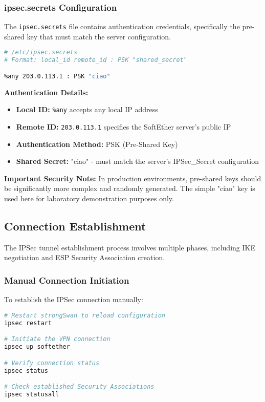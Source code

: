 \subsubsection{ipsec.secrets Configuration}

The \texttt{ipsec.secrets} file contains authentication credentials, specifically the pre-shared key that must match the server configuration.

\begin{lstlisting}[language=bash]
# /etc/ipsec.secrets
# Format: local_id remote_id : PSK "shared_secret"

%any 203.0.113.1 : PSK "ciao"
\end{lstlisting}

\textbf{Authentication Details:}

\begin{itemize}
    \item \textbf{Local ID:} \texttt{\%any} accepts any local IP address
    \item \textbf{Remote ID:} \texttt{203.0.113.1} specifies the SoftEther server's public IP
    \item \textbf{Authentication Method:} PSK (Pre-Shared Key)
    \item \textbf{Shared Secret:} "ciao" - must match the server's IPSec\_Secret configuration
\end{itemize}

\noindent
\textbf{Important Security Note:} In production environments, pre-shared keys should be significantly more complex and randomly generated. The simple "ciao" key is used here for laboratory demonstration purposes only.

\subsection{Connection Establishment}

The IPSec tunnel establishment process involves multiple phases, including IKE negotiation and ESP Security Association creation.

\subsubsection{Manual Connection Initiation}

To establish the IPSec connection manually:

\begin{lstlisting}[language=bash]
# Restart strongSwan to reload configuration
ipsec restart

# Initiate the VPN connection
ipsec up softether

# Verify connection status
ipsec status

# Check established Security Associations
ipsec statusall
\end{lstlisting}

